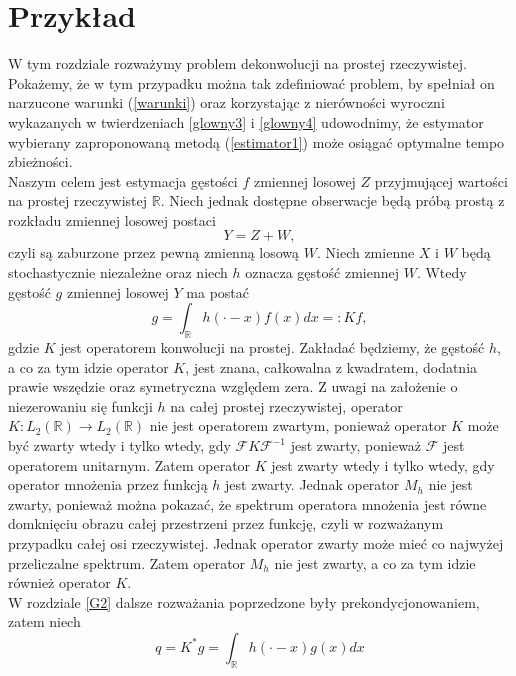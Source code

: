 \documentclass[man,mfiu]{mgrwms}
\begin{document}
\chapter{Przykład}\label{przyklad}
W tym rozdziale rozważymy problem dekonwolucji na prostej rzeczywistej. Pokażemy, że w tym przypadku można tak zdefiniować problem, by spełniał on narzucone warunki (\ref{warunki}) oraz korzystając z nierówności wyroczni wykazanych w twierdzeniach \ref{glowny3} i \ref{glowny4} udowodnimy, że estymator wybierany zaproponowaną metodą (\ref{estimator1}) może osiągać optymalne tempo zbieżności.\\
\indent Naszym celem jest estymacja gęstości $f$ zmiennej losowej $Z$ przyjmującej wartości na prostej rzeczywistej $\mathbb{R}$. Niech jednak dostępne obserwacje będą próbą prostą z rozkładu zmiennej losowej postaci
\begin{displaymath}
Y=Z+W,
\end{displaymath}
czyli są zaburzone przez pewną zmienną losową $W$. Niech zmienne $X$ i $W$ będą stochastycznie niezależne oraz niech $h$ oznacza gęstość zmiennej $W$. Wtedy gęstość $g$ zmiennej losowej $Y$ ma postać 
\begin{equation}\label{0}
g=\int_{\mathbb{R}}h(\cdot -x)f(x)dx=\colon Kf,
\end{equation}
gdzie $K$ jest operatorem konwolucji na prostej. Zakładać będziemy, że gęstość $h$, a co za tym idzie operator $K$, jest znana, całkowalna z kwadratem, dodatnia prawie wszędzie oraz symetryczna względem zera. Z uwagi na założenie o niezerowaniu się funkcji $h$ na całej prostej rzeczywistej, operator $K\colon L_2(\mathbb{R}) \to L_2(\mathbb{R})$ nie jest operatorem zwartym, ponieważ operator $K$ może być zwarty wtedy i tylko wtedy, gdy $\mathcal{F}K\mathcal{F}^{-1}$ jest zwarty, ponieważ $\mathcal{F}$ jest operatorem unitarnym. Zatem operator $K$ jest zwarty wtedy i tylko wtedy, gdy operator mnożenia przez funkcją $h$ jest zwarty. Jednak operator $M_h$ nie jest zwarty, ponieważ można pokazać, że spektrum operatora mnożenia jest równe domknięciu obrazu całej przestrzeni przez funkcję, czyli w rozważanym przypadku całej osi rzeczywistej. Jednak operator zwarty może mieć co najwyżej przeliczalne spektrum. Zatem operator $M_h$ nie jest zwarty, a co za tym idzie również operator $K$.\\
\indent W rozdziale \ref{G2} dalsze rozważania poprzedzone były prekondycjonowaniem, zatem niech 
\begin{displaymath}
q=K^*g = \int_{\mathbb{R}}h(\cdot -x)g(x)dx
\end{displaymath}
\end{document}
